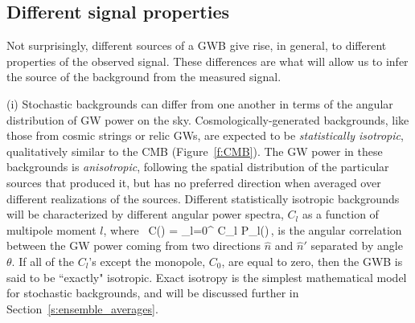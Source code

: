 \subsection{Different signal properties}
\label{s:different_signal_properties}

Not surprisingly, different sources of a GWB give
rise, in general, to different properties of the 
observed signal.
These differences are what will allow us to infer 
the source of the background from the measured signal.

(i) Stochastic backgrounds can differ from one another 
in terms of the angular distribution of 
GW power on the sky.
Cosmologically-generated backgrounds, like those from 
cosmic strings or relic GWs,
are expected to be {\em statistically isotropic},
qualitatively similar to the CMB (Figure~\ref{f:CMB}).
The GW power in these backgrounds is {\em anisotropic}, 
following the spatial distribution of the particular
sources that produced it, but has no preferred 
direction when averaged over different realizations 
of the sources.
Different statistically isotropic backgrounds will
be characterized by different angular power spectra,
$C_l$ as a function of multipole moment $l$, where~\cite{Ryden:2003}
%
\be
C(\theta) = \sum_{l=0}^\infty {} 
C_l P_l(\cos\theta)\,,
\label{e:legendre_series}
\ee
%
is the angular correlation between the GW power 
coming from two directions $\hat n$ and $\hat n'$
separated by angle $\theta$.
If all of the $C_l$'s except the monopole, $C_0$, 
are equal to zero, then the GWB is said to be 
``exactly" isotropic.
Exact isotropy is the simplest mathematical model 
for stochastic backgrounds, and will be discussed
further in Section~\ref{s:ensemble_averages}.

